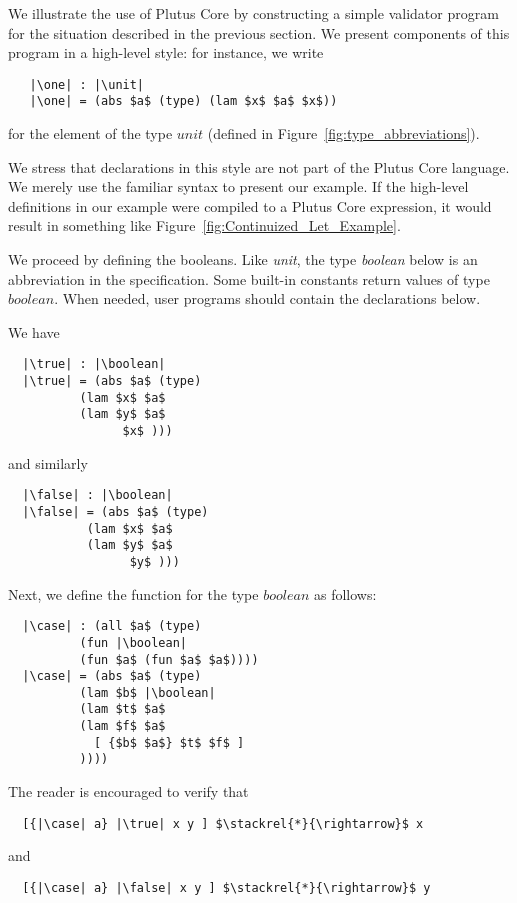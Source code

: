\documentclass[../plutus-core-specification.tex]{subfiles}
\begin{document}
We illustrate the use of Plutus Core by constructing a simple
validator program for the situation described in the previous
section. We present components of this program in a high-level style:
for instance, we write
\begin{lstlisting}
   |\one| : |\unit|
   |\one| = (abs $a$ (type) (lam $x$ $a$ $x$))
\end{lstlisting}
for the element of the type $unit$ (defined in Figure~\ref{fig:type_abbreviations}).

We stress that declarations in this style are not part of the Plutus
Core language. We merely use the familiar syntax to present our
example. If the high-level definitions in our example were compiled to
a Plutus Core expression, it would result in something like
Figure~\ref{fig:Continuized_Let_Example}.

We proceed by defining the booleans. Like \textit{unit}, the type \textit{boolean}
below is an abbreviation in the specification. Some built-in constants
return values of type $boolean$. When needed, user programs should
contain the declarations below.


\noindent We have

\begin{lstlisting}
  |\true| : |\boolean|
  |\true| = (abs $a$ (type)
          (lam $x$ $a$
          (lam $y$ $a$
                $x$ )))
\end{lstlisting}
and similarly
\begin{lstlisting}
  |\false| : |\boolean|
  |\false| = (abs $a$ (type)
           (lam $x$ $a$
           (lam $y$ $a$
                 $y$ )))
\end{lstlisting}

\noindent Next, we define the \case{} function for the type $boolean$ as follows:
\begin{lstlisting}
  |\case| : (all $a$ (type)
          (fun |\boolean|
          (fun $a$ (fun $a$ $a$))))
  |\case| = (abs $a$ (type)
          (lam $b$ |\boolean|
          (lam $t$ $a$
          (lam $f$ $a$
            [ {$b$ $a$} $t$ $f$ ]
          ))))
\end{lstlisting}
The reader is encouraged to verify that
\begin{lstlisting}
  [{|\case| a} |\true| x y ] $\stackrel{*}{\rightarrow}$ x
\end{lstlisting}
and
\begin{lstlisting}
  [{|\case| a} |\false| x y ] $\stackrel{*}{\rightarrow}$ y
\end{lstlisting}
\end{document}
